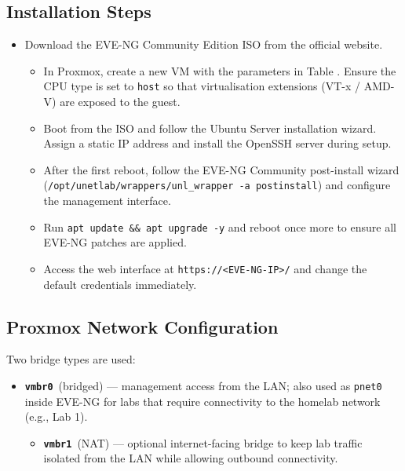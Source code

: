 \subsection{Installation Steps}

\begin{itemize}
\tightlist
\item
  Download the EVE-NG Community Edition ISO from the official website.

  \begin{itemize}
  \tightlist
  \item
    In Proxmox, create a new VM with the parameters in Table . Ensure the CPU type is set to \texttt{host} so that virtualisation extensions (VT-x / AMD-V) are exposed to the guest.
  \item
    Boot from the ISO and follow the Ubuntu Server installation wizard. Assign a static IP address and install the OpenSSH server during setup.
  \item
    After the first reboot, follow the EVE-NG Community post-install wizard (\texttt{/opt/unetlab/wrappers/unl\_wrapper\ -a\ postinstall}) and configure the management interface.
  \item
    Run \texttt{apt\ update\ \&\&\ apt\ upgrade\ -y} and reboot once more to ensure all EVE-NG patches are applied.
  \item
    Access the web interface at \texttt{https://\textless{}EVE-NG-IP\textgreater{}/} and change the default credentials immediately.
  \end{itemize}
\end{itemize}

\subsection{Proxmox Network Configuration}

Two bridge types are used:

\begin{itemize}
\tightlist
\item
  \textbf{\texttt{vmbr0}}\ (bridged) --- management access from the LAN; also used as \texttt{pnet0} inside EVE-NG for labs that require connectivity to the homelab network (e.g., Lab 1).

  \begin{itemize}
  \tightlist
  \item
    \textbf{\texttt{vmbr1}}\ (NAT) --- optional internet-facing bridge to keep lab traffic isolated from the LAN while allowing outbound connectivity.
  \end{itemize}
\end{itemize}

